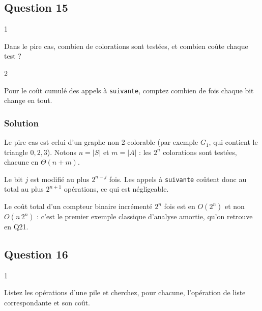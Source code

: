 \documentclass[11pt,a4paper]{article}
\newcommand{\equationajustee}[1]{%
  \sbox{\boiteequation}{$\displaystyle #1$}%
  \ifdim\wd\boiteequation>\linewidth
    \[\resizebox{\linewidth}{!}{\usebox{\boiteequation}}\]%
  \else
    \[#1\]%
  \fi}
\begin{document}
\hypertarget{question-15}{%
\subsection{Question 15}\label{question-15}}

\begin{indication}{1}

Dans le pire cas, combien de colorations sont testées, et combien coûte chaque test ?

\end{indication}

\begin{indication}{2}

Pour le coût cumulé des appels à \texttt{suivante}, comptez combien de fois chaque bit change en tout.

\end{indication}

\hypertarget{solution-14}{%
\subsubsection{Solution}\label{solution-14}}

Le pire cas est celui d'un graphe non 2-colorable (par exemple \(G_1\), qui contient le triangle \(0, 2, 3\)). Notons \(n = |S|\) et \(m = |A|\) : les \(2^n\) colorations sont testées, chacune en \(\Theta(n + m)\).

Le bit \(j\) est modifié au plus \(2^{n-j}\) fois. Les appels à \texttt{suivante} coûtent donc au total au plus \(2^{n+1}\) opérations, ce qui est négligeable.

\equationajustee{\boxed{\,C_{\text{pire}} = \Theta\big(2^{|S|}(|S| + |A|)\big) = O\big(2^{|S|}\,|S|^2\big)\,}}

\begin{methode}

Le coût total d'un compteur binaire incrémenté \(2^n\) fois est en \(O(2^n)\) et non \(O(n\,2^n)\) : c'est le premier exemple classique d'analyse amortie, qu'on retrouve en Q21.

\end{methode}

\hypertarget{question-16}{%
\subsection{Question 16}\label{question-16}}

\begin{indication}{1}

Listez les opérations d'une pile et cherchez, pour chacune, l'opération de liste correspondante et son coût.

\end{indication}
\end{document}
